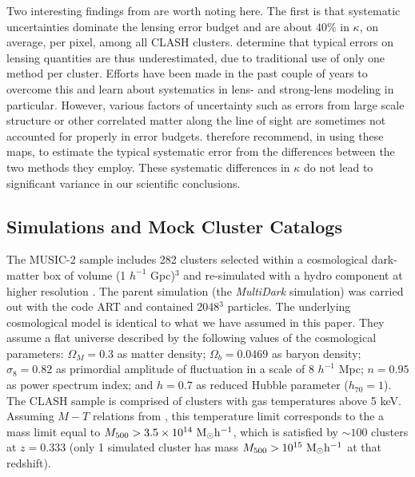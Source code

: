 \documentclass[iop,twocolumn]{emulateapj}
\begin{document}
{Two interesting findings from \citet{2015ApJ...801...44Z} are worth noting here. 
The first is that systematic uncertainties dominate the lensing error budget and are about $40\%$ in 
$\kappa$, on average, per pixel, among all CLASH clusters. 
\citet{2015ApJ...801...44Z} determine that typical errors on lensing quantities are thus underestimated,  due to traditional use of only one method per cluster.  Efforts have been made in the past couple of years to overcome this and learn about systematics in lens- and strong-lens modeling in particular. However, various factors of uncertainty such as errors from large scale structure or other correlated matter along the line of sight \citep[e.g., ][]{2012MNRAS.420L..18H,2011MNRAS.411.1628D} are sometimes not accounted for properly in error budgets. 
\citet{2015ApJ...801...44Z} therefore recommend, in using these maps, to estimate the typical systematic error from the 
differences between the two methods they employ. 
These systematic differences in $\kappa$ do not lead to significant variance in our scientific conclusions. 


\subsection{Simulations and Mock Cluster Catalogs}

The MUSIC-2 sample includes 282 clusters selected within a
cosmological dark-matter box of volume (1 $h^{-1}$ Gpc)$^3$ and
re-simulated with a hydro component at higher resolution
\citep{sembolini.etal.2013}.  The parent simulation (the {\em
  MultiDark} simulation) was carried out with the code ART
\citep{kravtsov.etal.97} and contained 2048$^3$ particles. The
underlying cosmological model is identical to what we have
assumed in this paper. They assume a flat universe described by the
following values of the cosmological parameters: $\Omega_M=0.3$ as matter density;
$\Omega_b=0.0469$ as baryon density; $\sigma_8=0.82$ as primordial
amplitude of fluctuation in a scale of 8 $h^{-1}$ Mpc; $n=0.95$ as
power spectrum index; and $h=0.7$ as reduced Hubble parameter ($h_{70}=1$).
The CLASH sample is comprised of clusters with gas temperatures above 5 keV. 
Assuming $M-T$ relations from \citet{2009ApJ...692.1033V}, this temperature limit corresponds to the 
a mass limit equal to $M_{500} > 3.5 \times10^{14} ~\rm{M}_{\odot} h^{-1}$, which 
is satisfied by $\sim 100$ clusters at $z=0.333$ 
(only 1 simulated cluster has mass $M_{500}> 10^{15}~\rm{M}_{\odot} h^{-1}$ at that redshift).

}
\end{document}
